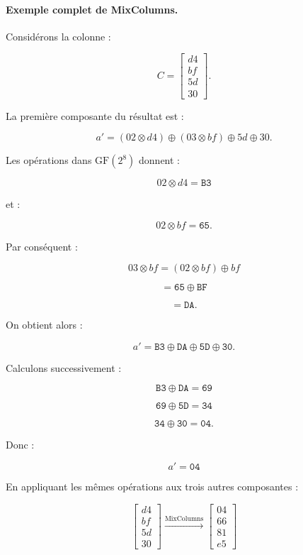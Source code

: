 \documentclass[12pt,a4paper]{article}
\begin{document}

\paragraph{Exemple complet de MixColumns.}

Considérons la colonne :

\[
C=
\begin{bmatrix}
d4\\
bf\\
5d\\
30
\end{bmatrix}.
\]

La première composante du résultat est :

\[
a'=
(02\otimes d4)
\oplus
(03\otimes bf)
\oplus
5d
\oplus
30.
\]

Les opérations dans $\mathrm{GF}(2^8)$ donnent :

\[
02\otimes d4=\texttt{B3}
\]

et :

\[
02\otimes bf=\texttt{65}.
\]

Par conséquent :

\[
03\otimes bf
=
(02\otimes bf)\oplus bf
\]

\[
=\texttt{65}\oplus\texttt{BF}
\]

\[
=\texttt{DA}.
\]

On obtient alors :

\[
a'=
\texttt{B3}
\oplus
\texttt{DA}
\oplus
\texttt{5D}
\oplus
\texttt{30}.
\]

Calculons successivement :

\[
\texttt{B3}\oplus\texttt{DA}
=
\texttt{69}
\]

\[
\texttt{69}\oplus\texttt{5D}
=
\texttt{34}
\]

\[
\texttt{34}\oplus\texttt{30}
=
\texttt{04}.
\]

Donc :

\[
\boxed{
a'=\texttt{04}
}
\]

En appliquant les mêmes opérations aux trois autres composantes :

\[
\boxed{
\begin{bmatrix}
d4\\
bf\\
5d\\
30
\end{bmatrix}
\overset{\text{MixColumns}}{\longrightarrow}
\begin{bmatrix}
04\\
66\\
81\\
e5
\end{bmatrix}
}
\]
\end{document}
